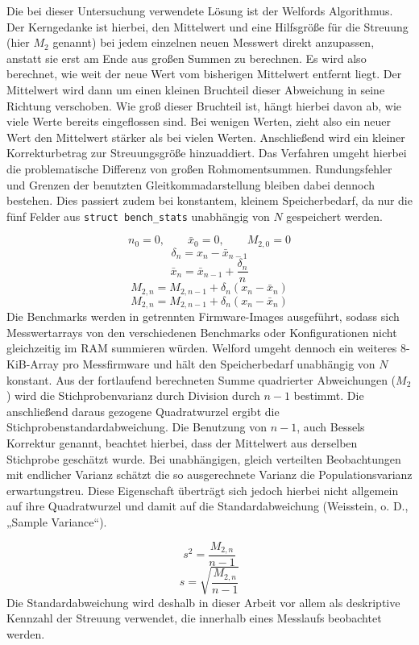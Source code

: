 Die bei dieser Untersuchung verwendete Lösung ist der Welfords Algorithmus. Der Kerngedanke ist hierbei, den Mittelwert und eine Hilfsgröße für die Streuung (hier \(M_2\) genannt) bei jedem einzelnen neuen Messwert direkt anzupassen, anstatt sie erst am Ende aus großen Summen zu berechnen. Es wird also berechnet, wie weit der neue Wert vom bisherigen Mittelwert entfernt liegt. Der Mittelwert wird dann um einen kleinen Bruchteil dieser Abweichung in seine Richtung verschoben. Wie groß dieser Bruchteil ist, hängt hierbei davon ab, wie viele Werte bereits eingeflossen sind. Bei wenigen Werten, zieht also ein neuer Wert den Mittelwert stärker als bei vielen Werten. Anschließend wird ein kleiner Korrekturbetrag zur Streuungsgröße hinzuaddiert. Das Verfahren umgeht hierbei die problematische Differenz von großen Rohmomentsummen. Rundungsfehler und Grenzen der benutzten Gleitkommadarstellung bleiben dabei dennoch bestehen. Dies passiert zudem bei konstantem, kleinem Speicherbedarf, da nur die fünf Felder aus \lstinline[style=fileinline]|struct bench_stats| unabhängig von \(N\) gespeichert werden.

\[n_0 = 0, \qquad \bar{x}_0 = 0, \qquad M_{2,0} = 0\]
\[\delta_n = x_n - \bar{x}_{n-1}\]
\[\bar{x}_n = \bar{x}_{n-1} + \frac{\delta_n}{n}\]
\[M_{2,n} = M_{2,n-1} + \delta_n \left(x_n - \bar{x}_n\right)\]
\[M_{2,n} = M_{2,n-1} + \delta_n \left(x_n - \bar{x}_n\right)\]
Die Benchmarks werden in getrennten Firmware-Images ausgeführt, sodass sich Messwertarrays von den verschiedenen Benchmarks oder Konfigurationen nicht gleichzeitig im RAM summieren würden. Welford umgeht dennoch ein weiteres 8-KiB-Array pro Messfirmware und hält den Speicherbedarf unabhängig von \(N\) konstant. Aus der fortlaufend berechneten Summe quadrierter Abweichungen (\(M_2\)) wird die Stichprobenvarianz durch Division durch \(n-1\) bestimmt. Die anschließend daraus gezogene Quadratwurzel ergibt die Stichprobenstandardabweichung. Die Benutzung von \(n-1\), auch Bessels Korrektur genannt, beachtet hierbei, dass der Mittelwert aus derselben Stichprobe geschätzt wurde. Bei unabhängigen, gleich verteilten Beobachtungen mit endlicher Varianz schätzt die so ausgerechnete Varianz die Populationsvarianz erwartungstreu. Diese Eigenschaft überträgt sich jedoch hierbei nicht allgemein auf ihre Quadratwurzel und damit auf die Standardabweichung (Weisstein, o. D., „Sample Variance“).

\[s^2 = \frac{M_{2,n}}{n-1}\]
\[s = \sqrt{\frac{M_{2,n}}{n-1}}\]
Die Standardabweichung wird deshalb in dieser Arbeit vor allem als deskriptive Kennzahl der Streuung verwendet, die innerhalb eines Messlaufs beobachtet werden.


